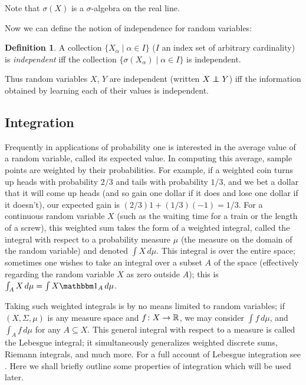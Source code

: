 \documentclass{article}
\theoremstyle{definition}
\newtheorem{definition}[theorem]{Definition}
\newcommand{\bldset}[2]{\{{#1}\mid{#2}\}}
\newcommand\indep{\protect\mathpalette{\protect\independenT}{\perp}}
\def\independenT#1#2{\mathrel{\rlap{$#1#2$}\mkern2mu{#1#2}}}
\begin{document}
Note that $\sigma(X)$ is a $\sigma$-algebra on the real line.

Now we can define the notion of independence for random variables:

\begin{definition}
A collection $\bldset{X_\alpha}{\alpha \in I}$ ($I$ an index set of arbitrary cardinality) is {\em independent} iff the collection $\bldset{\sigma(X_\alpha)}{\alpha \in I}$ is independent.
\end{definition}

Thus random variables $X$, $Y$ are independent (written $X \indep Y$) iff the information obtained by learning each of their values is independent.


\subsection{Integration}

Frequently in applications of probability one is interested in the average value of a random variable, called its expected value. In computing this average, sample points are weighted by their probabilities. For example, if a weighted coin turns up heads with probability $2/3$ and tails with probability $1/3$, and we bet a dollar that it will come up heads (and so gain one dollar if it does and lose one dollar if it doesn't), our expected gain is $(2/3)1 + (1/3)(-1) = 1/3$. For a continuous random variable $X$ (such as the waiting time for a train or the length of a screw), this weighted sum takes the form of a weighted integral, called the integral with respect to a probability measure $\mu$ (the measure on the domain of the random variable) and denoted $\int X \, d\mu$. This integral is over the entire space; sometimes one wishes to take an integral over a subset $A$ of the space (effectively regarding the random variable $X$ as zero outside $A$); this is $\int_A X \, d\mu = \int X \mathbbm 1_A \, d\mu$.

Taking such weighted integrals is by no means limited to random variables; if $(X, \Sigma, \mu)$ is any measure space and $f\colon X \rightarrow \mathbb{R}$, we may consider $\int f \, d\mu$, and $\int_A f \, d\mu$ for any $A \subseteq X$. This general integral with respect to a measure is called the Lebesgue integral; it simultaneously generalizes weighted discrete sums, Riemann integrals, and much more. For a full account of Lebesgue integration see \cite{billingsley}. Here we shall briefly outline some properties of integration which will be used later.
\end{document}
